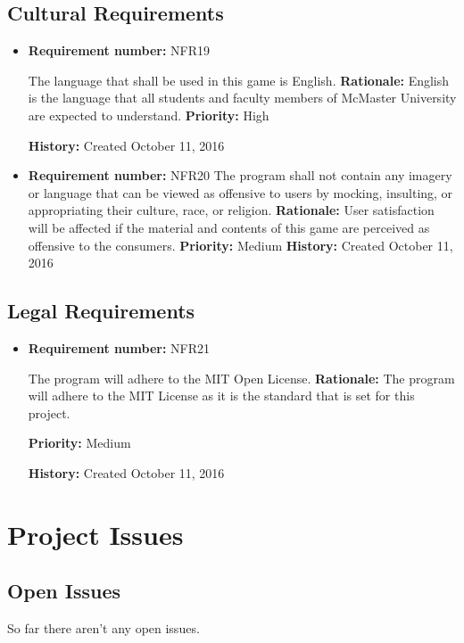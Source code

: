 \documentclass[12pt,letterpaper]{article}
\begin{document}
\subsection{Cultural Requirements}
\begin{reqbox}
	\begin{itemize}
	\item \textbf{Requirement number: }NFR19 
	
	The language that shall be used in this game is English.
	\textbf{Rationale: }English is the language that all students and faculty members of McMaster University are expected to understand.
	\textbf{Priority: }High
	
	\textbf{History: }Created October 11, 2016
	\end{itemize}
\end{reqbox}
\begin{reqbox}
	\begin{itemize}
	\item \textbf{Requirement number: }NFR20
	The program shall not contain any imagery or language that can be viewed as offensive to users by mocking, insulting, or appropriating their culture, race, or religion.
	\textbf{Rationale: }User satisfaction will be affected if the material and contents of this game are perceived as offensive to the consumers.
	\textbf{Priority: }Medium
	\textbf{History: }Created October 11, 2016
	\end{itemize}
\end{reqbox}
\subsection{Legal Requirements}
\begin{reqbox}
	\begin{itemize}
	\item \textbf{Requirement number: }NFR21   
	
	The program will adhere to the MIT Open License.
	\textbf{Rationale: }The program will adhere to the MIT License as it is the standard that is set for this project.
	
	\textbf{Priority: }Medium   
	
	\textbf{History: }Created October 11, 2016   
	\end{itemize}
\end{reqbox}
\section{Project Issues}
\subsection{Open Issues}
So far there aren’t any open issues.
\end{document}

